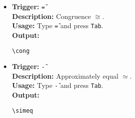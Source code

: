 \documentclass{article}
\begin{document}
\begin{itemize}[leftmargin=*, label={}]
\item \textbf{Trigger:} \texttt{\~=} \\
\textbf{Description:} Congruence \(\cong\). \\
\textbf{Usage:} Type \texttt{\~=} and press \texttt{Tab}. \\
\textbf{Output:}
\begin{verbatim}
\cong 
\end{verbatim}

\item \textbf{Trigger:} \texttt{\~-} \\
\textbf{Description:} Approximately equal \(\simeq\). \\
\textbf{Usage:} Type \texttt{\~-} and press \texttt{Tab}. \\
\textbf{Output:}
\begin{verbatim}
\simeq 
\end{verbatim}
\end{itemize}
\end{document}
